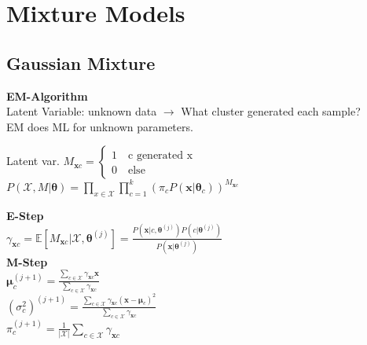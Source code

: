 

\section*{Mixture Models}

\subsection*{Gaussian Mixture}
\textbf{EM-Algorithm}\\
Latent Variable: unknown data $\rightarrow$ What cluster generated each sample?\\
EM does ML for unknown parameters.

Latent var. $M_{\mathbf{x}c}{=}\begin{cases} 
       1 \quad \text{c generated x}\\
       0 \quad \text{else}
       \end{cases} 
$\\
$P(\mathcal{X}, M|\mathbf{\theta}){=}\prod_{x\in\mathcal{X}}\prod_{c=1}^k(\pi_cP(\mathbf{x}|\mathbf{\theta}_c))^{M_{\mathbf{x}c}}$

\textbf{E-Step}\\
$ \gamma_{\mathbf{x}c}{=}\mathbb{E}[M_{\mathbf{x}c}|\mathcal{X},\mathbf{\theta}^{(j)}]{=}\frac{P(\mathbf{x}|c,\mathbf{\theta}^{(j)})P(c|\mathbf{\theta}^{(j)})}{P(\mathbf{x}|\mathbf{\theta}^{(j)})}$\\
\textbf{M-Step}\\
$\mathbf{\mu}_c^{(j+1)}=\frac{\sum_{c\in\mathcal{X}}\gamma_{\mathbf{x}c}\mathbf{x}}{\sum_{c\in\mathcal{X}}\gamma_{\mathbf{x}c}}$\\
$(\sigma_c^2)^{(j+1)}=\frac{\sum_{c\in\mathcal{X}}\gamma_{\mathbf{x}c}(\mathbf{x}-\mathbf{\mu}_c)^2}{\sum_{c\in\mathcal{X}}\gamma_{\mathbf{x}c}}$\\
$\pi_c^{(j+1)}=\frac{1}{|\mathcal{X}|}\sum_{c\in\mathcal{X}}\gamma_{\mathbf{x}c}$\\


